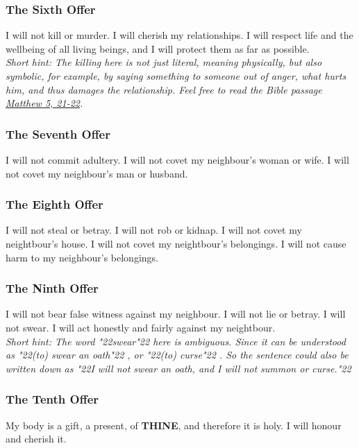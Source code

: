 \documentclass[12pt,a4paper]{article}
\newcommand{\Thine}[0]{\textbf{THINE}}
\newcommand{\q}[1]{\char"22{#1}\char"22 }
\begin{document}
	\subsubsection{The Sixth Offer} \label{TheSixthOffer}
		I will not kill or murder.
		I will cherish my relationships.
		I will respect life and the wellbeing of all living beings,
		and I will protect them as far as possible.
		\\
		\textit{Short hint:
		The killing here is not just literal,
		meaning physically,
		but also symbolic,
		for example,
		by saying something to someone out of anger,
		what hurts him,
		and thus damages the relationship.
		Feel free to read the Bible passage \href{https://www.die-bibel.de/bibeln/online-bibeln/lesen/ESV/MAT.5/Matthew-5}{Matthew 5, 21-22}.}
		
	\subsubsection{The Seventh Offer}
		I will not commit adultery.
		I will not covet my neighbour's woman or wife.
		I will not covet my neighbour's man or husband.
		
	\subsubsection{The Eighth Offer}
		I will not steal or betray.
		I will not rob or kidnap.
		I will not covet my neightbour's house.
		I will not covet my neightbour's belongings.
		I will not cause harm to my neighbour's belongings.
		
	\subsubsection{The Ninth Offer} \label{TheNinthOffer}
		I will not bear false witness against my neighbour.
		I will not lie or betray.
		I will not swear.
		I will act honestly and fairly against my neightbour.
		\\
		\textit{Short hint:
		The word \q{swear} here is ambiguous.
		Since it can be understood as \q{(to) swear an oath},
		or \q{(to) curse}.
		So the sentence could also be written down as
		\q{I will not swear an oath, and I will not summon or curse.}}
		
	\subsubsection{The Tenth Offer} \label{TheTenthOffer}
		My body is a gift, a present, of {\Thine},
		and therefore it is holy.
		I will honour and cherish it.
\end{document}
